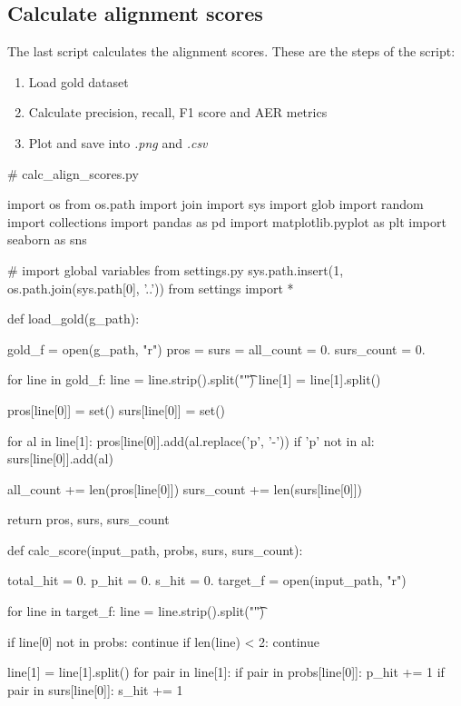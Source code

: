 \subsection{Calculate alignment scores}

The last script calculates the alignment scores. These are the steps of the script:

\begin{enumerate}
  \item Load gold dataset
  \item Calculate precision, recall, F1 score and AER metrics
  \item Plot and save into \emph{.png} and \emph{.csv}
\end{enumerate}

\begin{python}
# calc_align_scores.py

import os
from os.path import join
import sys
import glob
import random
import collections
import pandas as pd
import matplotlib.pyplot as plt
import seaborn as sns

# import global variables from settings.py
sys.path.insert(1, os.path.join(sys.path[0], '..'))
from settings import *

def load_gold(g_path):

  gold_f = open(g_path, "r")
  pros = {}
  surs = {}
  all_count = 0.
  surs_count = 0.

  for line in gold_f:
    line = line.strip().split("\t")
    line[1] = line[1].split()

    pros[line[0]] = set()
    surs[line[0]] = set()

    for al in line[1]:
      pros[line[0]].add(al.replace('p', '-'))
      if 'p' not in al:
        surs[line[0]].add(al)

    all_count += len(pros[line[0]])
    surs_count += len(surs[line[0]])

  return pros, surs, surs_count

def calc_score(input_path, probs, surs, surs_count):

  total_hit = 0.
  p_hit = 0.
  s_hit = 0.
  target_f = open(input_path, "r")

  for line in target_f:
    line = line.strip().split("\t")

    if line[0] not in probs: continue
    if len(line) < 2: continue

    line[1] = line[1].split()
    for pair in line[1]:
      if pair in probs[line[0]]:
        p_hit += 1
      if pair in surs[line[0]]:
        s_hit += 1


\end{python}

